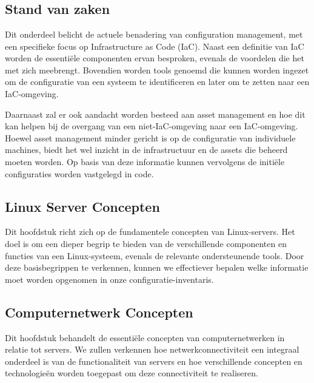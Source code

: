
\chapter{}%
\label{ch:methodologie}

\section{Stand van zaken}
\label{sec:stand-van-zaken}
Dit onderdeel belicht de actuele benadering van configuration management, met een specifieke focus op Infrastructure as Code (IaC).
Naast een definitie van IaC worden de essenti\"ele componenten ervan besproken, evenals de voordelen die het met zich meebrengt.
Bovendien worden tools genoemd die kunnen worden ingezet om de configuratie van een systeem te identificeren en later om te zetten naar een IaC-omgeving.

Daarnaast zal er ook aandacht worden besteed aan asset management en hoe dit kan helpen bij de overgang van een niet-IaC-omgeving naar een IaC-omgeving.
Hoewel asset management minder gericht is op de configuratie van individuele machines, biedt het wel inzicht in de infrastructuur en de assets die beheerd moeten worden.
Op basis van deze informatie kunnen vervolgens de initi\"ele configuraties worden vastgelegd in code.

\section{Linux Server Concepten}
\label{sec:linux-server-concepten}
Dit hoofdstuk richt zich op de fundamentele concepten van Linux-servers.
Het doel is om een dieper begrip te bieden van de verschillende componenten en functies van een Linux-systeem, evenals de relevante ondersteunende tools.
Door deze basisbegrippen te verkennen, kunnen we effectiever bepalen welke informatie moet worden opgenomen in onze configuratie-inventaris.

\section{Computernetwerk Concepten}
\label{sec:computernetwerk-concepten}
Dit hoofdstuk behandelt de essenti\"ele concepten van computernetwerken in relatie tot servers.
We zullen verkennen hoe netwerkconnectiviteit een integraal onderdeel is van de functionaliteit van servers en hoe verschillende concepten en technologie\"en worden toegepast om deze connectiviteit te realiseren.

